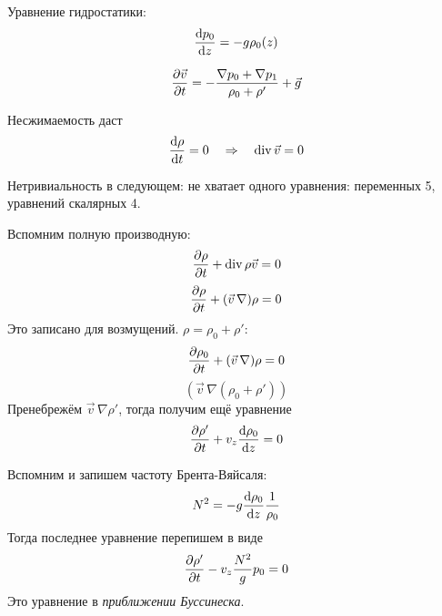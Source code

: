 Уравнение гидростатики:
\begin{equation}
    \dv{p_0}{z} = -g \rho_0(z)
\end{equation}

\begin{equation}
    \pdv{\vec{v}}{t} = -\frac{\nabla p_0+\nabla p_1}{\rho_0+\rho'}+\vec{g}
\end{equation}

Несжимаемость даст
\begin{equation}
    \dv{\rho}{t} = 0 \quad \Rightarrow \quad
    \operatorname{div} \vec{v} = 0
\end{equation}

Нетривиальность в следующем: не хватает одного уравнения: переменных 5, уравнений скалярных 4.

Вспомним полную производную:
\begin{equation}
    \pdv{\rho}{t}+\operatorname{div} \rho \vec{v} = 0
\end{equation}
\begin{equation}
    \pdv{\rho}{t}+(\vec{v}\,\nabla)\rho = 0
\end{equation}
Это записано для возмущений. $\rho = \rho_0+\rho'$:
\begin{equation}
    \pdv{\rho_0}{t}+(\vec{v}\,\nabla)\rho = 0
\end{equation}
\begin{equation}
    (\vec{v}\,\nabla(\rho_0+\rho'))
\end{equation}
Пренебрежём $\vec{v}\,\nabla \rho'$, тогда получим ещё уравнение
\begin{equation}
    \pdv{\rho'}{t}+v_z\dv{\rho_0}{z} = 0
\end{equation}

Вспомним и запишем частоту Брента-Вяйсаля:
\begin{equation}
    N^2 = -g\dv{\rho_0}{z}\frac{1}{\rho_0}
\end{equation}
Тогда последнее уравнение перепишем в виде
\begin{equation}
    \pdv{\rho'}{t}-v_z \frac{N^2}{g}p_0 = 0
\end{equation}
Это уравнение  в \textit{приближении Буссинеска}.

